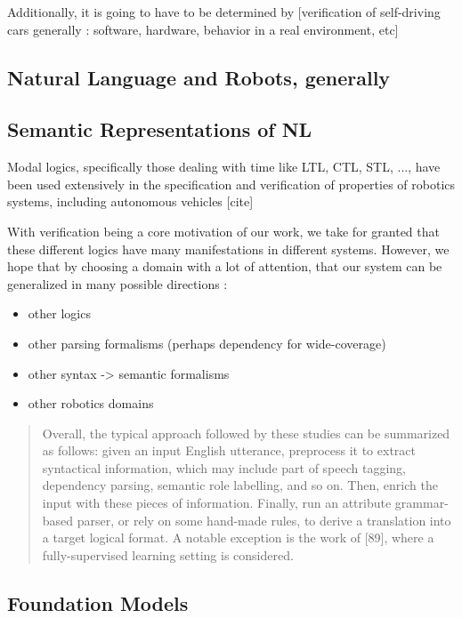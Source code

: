 \documentclass[a4paper, 11pt]{article}
\begin{document}
Additionally, it is going to have to be determined by 
[verification of self-driving cars generally : software, hardware, behavior in
a real environment, etc]


\subsection{Natural Language and Robots, generally}

\subsection{Semantic Representations of NL}

Modal logics, specifically those dealing with time like LTL, CTL, STL, ..., have
been used extensively in the specification and verification of properties of
robotics systems, including autonomous vehicles [cite]

With verification being a core motivation of our work, we take for granted that
these different logics have many manifestations in different systems. However,
we hope that by choosing a domain with a lot of attention, that our system can
be generalized in many possible directions :

\begin{itemize}
\item other logics
\item other parsing formalisms (perhaps dependency for wide-coverage)
\item other syntax -> semantic formalisms
\item other robotics domains
\end{itemize}


\begin{quote}
Overall, the typical approach followed by these studies can be summarized as follows:
given an input English utterance, preprocess it to extract syntactical information, which may
include part of speech tagging, dependency parsing, semantic role labelling, and so on. Then,
enrich the input with these pieces of information. Finally, run an attribute grammar-based
parser, or rely on some hand-made rules, to derive a translation into a target logical format.
A notable exception is the work of [89], where a fully-supervised learning setting is considered.
\cite{brunello_et_al}
\end{quote}


\subsection{Foundation Models}
\end{document}
